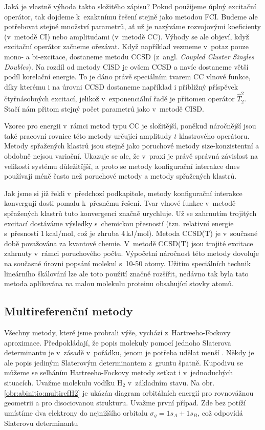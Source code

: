Jaká je vlastně výhoda takto složitého zápisu?
Pokud použijeme úplný excitační operátor, tak dojdeme k~exaktnímu řešení stejně jako metodou FCI. Budeme ale potřebovat stejné množství parametrů, ať už je nazýváme rozvojovými koeficienty (v~metodě CI) nebo amplitudami (v~metodě CC).
Výhody se ale objeví, když excitační operátor začneme ořezávat. Když například vezmeme v~potaz pouze mono- a bi-excitace, dostaneme metodu CCSD  (z~angl. \textit{Coupled Cluster Singles Doubles}).
Na rozdíl od metody CISD je ovšem CCSD  a navíc dostaneme větší podíl korelační energie.
To je dáno právě speciálním tvarem CC vlnové funkce, díky kterému i na úrovni CCSD dostaneme například i přibližný příspěvek čtyřnásobných excitací, jelikož v~exponenciální řadě je přítomen operátor $\hat{T}_2^2$. Stačí nám přitom stejný počet parametrů jako v~metodě CISD.

Vzorec pro energii v~rámci metod typu CC je složitější, poněkud náročnější jsou také pracovní rovnice této metody určující amplitudy $t$ klastrového operátoru. Metody spřažených klastrů jsou stejně jako poruchové metody size-konzistentní a obdobně nejsou variační. Ukazuje se ale, že v~praxi je právě správná závislost na velikosti systému důležitější, a proto se metody konfigurační interakce dnes používají méně často než poruchové metody a metody spřažených klastrů.

Jak jsme si již řekli v~předchozí podkapitole, metody konfigurační interakce konvergují dosti pomalu k~přesnému řešení. Tvar vlnové funkce v~metodě spřažených klastrů tuto konvergenci značně urychluje. Už se zahrnutím trojitých excitací dostáváme výsledky s~chemickou přesností (tzn. relativní energie s~přesností 1\,kcal/mol, což je zhruba 4\,kJ/mol).
Metoda CCSD(T) je v~současné době považována za  kvantové chemie. V~metodě CCSD(T) jsou trojité excitace zahrnuty v~rámci poruchového počtu. Výpočetní náročnost této metody dovoluje na současné úrovni popsání molekul s~10-50
atomy. Užitím speciálních technik lineárního škálování lze ale toto použití značně rozšířit, nedávno tak byla tato metoda aplikována na malou molekulu proteinu obsahující stovky atomů. 

\subsection{Multireferenční metody}

Všechny metody, které jsme probrali výše, vychází z~Hartreeho-Fockovy aproximace. Předpokládají, že popis molekuly pomocí jednoho Slaterova determinantu je v~zásadě v~pořádku, jenom je potřeba udělat menší . Někdy je ale popis jediným Slaterovým determinantem z~gruntu špatně. Kupodivu se můžeme se selháním Hartreeho-Fockovy metody setkat i v~jednoduchých situacích. Uvažme molekulu vodíku H$_2$ v~základním stavu. Na obr. \ref{obr:abinitio:multirefH2} je ukázán diagram orbitálních energií pro rovnovážnou geometrii a pro disociovanou strukturu. Uvažme první případ. Zde bez potíží umístíme dva elektrony do nejnižšího orbitalu $\sigma_g=1s_A+1s_B$, což odpovídá Slaterovu determinantu

